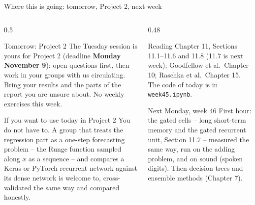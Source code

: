 \documentclass[10pt,aspectratio=169]{beamer}
\begin{document}
\begin{frame}{Where this is going: tomorrow, Project 2, next week}
\begin{columns}[T]
\begin{column}{0.5\textwidth}
\begin{block}{Tomorrow: Project 2}
The Tuesday session is yours for Project 2 (deadline \textbf{Monday
November 9}): open questions first, then work in your groups with us
circulating.  Bring your results and the parts of the report you are
unsure about.  No weekly exercises this week.
\end{block}
\begin{block}{If you want to use today in Project 2}
You do not have to.  A group that treats the regression part as a
one-step forecasting problem -- the Runge function sampled along $x$ as a
sequence -- and compares a Keras or PyTorch recurrent network against its
dense network is welcome to, cross-validated the same way and compared
honestly.
\end{block}
\end{column}
\begin{column}{0.48\textwidth}
\begin{block}{Reading}
Chapter 11, Sections 11.1--11.6 and 11.8 (11.7 is next week); Goodfellow et
al.\ Chapter 10; Raschka et al.\ Chapter 15.  The code of today is in
\texttt{week45.ipynb}.
\end{block}
\begin{block}{Next Monday, week 46}
First hour: the gated cells -- long short-term memory and the gated
recurrent unit, Section 11.7 -- measured the same way, run on the adding
problem, and on sound (spoken digits).  Then decision trees and ensemble
methods (Chapter 7).
\end{block}
\end{column}
\end{columns}
\end{frame}
\end{document}
